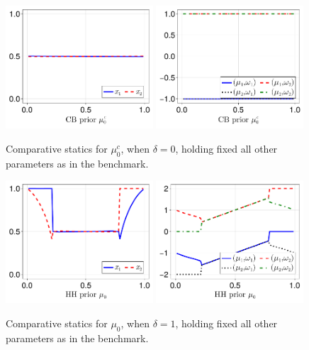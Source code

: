 \documentclass[12pt,a4paper]{article}
\begin{document}
\begin{figure}[H]
\centering
\includegraphics[width=0.49\textwidth]{figures/V8/γ_1/fig_optimal_π_across_μ_0_c_ω_1_1_ω_2_-1_δ_0.0_.pdf}
\includegraphics[width=0.49\textwidth]{figures/V8/γ_1/fig_posterior_across_μ_0_c_ω_1_1_ω_2_-1_δ_0.0_.pdf}
\caption{Comparative statics for $\mu_0^c$, when $\delta=0$, holding fixed all other parameters as in the benchmark.}
\label{FigureA22}
\end{figure}

\begin{figure}[H]
\centering
\includegraphics[width=0.49\textwidth]{figures/V8/γ_1/fig_optimal_π_across_μ_0_ω_1_1_ω_2_-1_δ_1.0_.pdf}
\includegraphics[width=0.49\textwidth]{figures/V8/γ_1/fig_posterior_across_μ_0_ω_1_1_ω_2_-1_δ_1.0_.pdf}
\caption{Comparative statics for $\mu_0$, when $\delta=1$, holding fixed all other parameters as in the benchmark.}
\label{FigureA23}
\end{figure}
\end{document}
